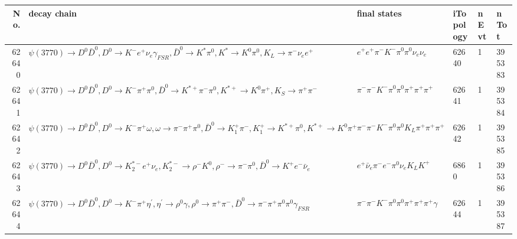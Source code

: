 \begin{table}[htbp] 
\begin{center}
\begin{small}
\begin{tabular}{rlllll}\hline\hline
 No. & decay chain & final states &  iTopology & nEvt & nTot \\\hline
62640&$\psi(3770) \rightarrow D^{0} \bar{D}^{0} , D^{0}  \rightarrow K^{-}          e^{+}        \nu_{e}           \gamma_{FSR} , \bar{D}^{0}  \rightarrow K^{*}          \pi^{0}        , K^{*}           \rightarrow K^{0}          \pi^{0}        , K_{L}           \rightarrow \pi^{-}        \nu_{e}           e^{+}        $&$e^{+}        e^{+}        \pi^{-}        K^{-}          \pi^{0}        \pi^{0}        \nu_{e}           \nu_{e}           $&62640&    1&395383\\
62641&$\psi(3770) \rightarrow D^{0} \bar{D}^{0} , D^{0}  \rightarrow K^{-}          \pi^{+}        \pi^{0}        , \bar{D}^{0}  \rightarrow K^{*+}         \pi^{-}        \pi^{0}        , K^{*+}          \rightarrow K^{0}          \pi^{+}        , K_{S}           \rightarrow \pi^{+}        \pi^{-}        $&$\pi^{-}        \pi^{-}        K^{-}          \pi^{0}        \pi^{0}        \pi^{+}        \pi^{+}        \pi^{+}        $&62641&    1&395384\\
62642&$\psi(3770) \rightarrow D^{0} \bar{D}^{0} , D^{0}  \rightarrow K^{-}          \pi^{+}        \omega         , \omega          \rightarrow \pi^{-}        \pi^{+}        \pi^{0}        , \bar{D}^{0}  \rightarrow K_1^{+}        \pi^{-}        , K_1^{+}         \rightarrow K^{*+}         \pi^{0}        , K^{*+}          \rightarrow K^{0}          \pi^{+}        $&$\pi^{-}        \pi^{-}        K^{-}          \pi^{0}        \pi^{0}        K_{L}          \pi^{+}        \pi^{+}        \pi^{+}        $&62642&    1&395385\\
62643&$\psi(3770) \rightarrow D^{0} \bar{D}^{0} , D^{0}  \rightarrow K_2^{*-}       e^{+}        \nu_{e}           , K_2^{*-}        \rightarrow \rho^{-}      K^{0}          , \rho^{-}       \rightarrow \pi^{-}        \pi^{0}        , \bar{D}^{0}  \rightarrow K^{+}          e^{-}        \bar{\nu}_{e}    $&$e^{+}        \bar{\nu}_{e}    \pi^{-}        e^{-}        \pi^{0}        \nu_{e}           K_{L}          K^{+}          $& 6860&    1&395386\\
62644&$\psi(3770) \rightarrow D^{0} \bar{D}^{0} , D^{0}  \rightarrow K^{-}          \pi^{+}        \eta^{\prime} , \eta^{\prime}  \rightarrow \rho^{0}      \gamma       , \rho^{0}       \rightarrow \pi^{+}        \pi^{-}        , \bar{D}^{0}  \rightarrow \pi^{-}        \pi^{+}        \pi^{0}        \pi^{0}        \gamma_{FSR} $&$\pi^{-}        \pi^{-}        K^{-}          \pi^{0}        \pi^{0}        \pi^{+}        \pi^{+}        \pi^{+}        \gamma       $&62644&    1&395387\\

\end{tabular}
\end{small}
\end{center}
\end{table}
